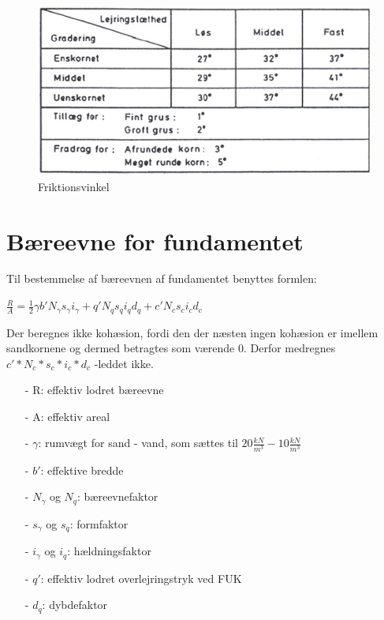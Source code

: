 \begin{figure}[htbp] \centering
	\begin{minipage}[b]{0.48\textwidth}\centering
		\includegraphics[width=1.2\textwidth]{billeder/friktionsvinkel.png}
		\caption{Friktionsvinkel \citep[ s. 170]{geoteknik}}
		\label{fig:friktionsvinkel}
	\end{minipage}\hfill
\end{figure}

\section{Bæreevne for fundamentet}
Til bestemmelse af bæreevnen af fundamentet benyttes formlen:
\begin{center}
	$\frac{R}{A} = \frac{1}{2} \gamma  b' N_\gamma s_\gamma i_\gamma + q' N_q s_q i_q d_q + c' N_c s_c i_c d_c$
\end{center}

Der beregnes ikke kohæsion, fordi den der næsten ingen kohæsion er imellem sandkornene og dermed betragtes som værende 0. Derfor medregnes $c'*N_c*s_c*i_c*d_c$ -leddet ikke.

\begin{itemize}
	\item[-] R: effektiv lodret bæreevne
	\item[-] A: effektiv areal
	\item[-] $\gamma$: rumvægt for sand - vand, som sættes til $20\frac{kN}{m^3} - 10\frac{kN}{m^3}$
	\item[-] $b'$: effektive bredde
	\item[-] $N_{\gamma}$ og $N_q$: bæreevnefaktor
	\item[-] $s_\gamma$ og $s_q$: formfaktor
	\item[-] $i_\gamma$ og $i_q$: hældningsfaktor
	\item[-] $q'$: effektiv lodret overlejringstryk ved FUK
	\item[-] $d_q$: dybdefaktor
\end{itemize}

